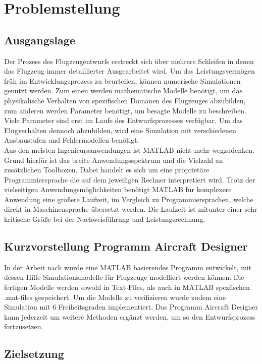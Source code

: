 \chapter{Problemstellung}
\section{Ausgangslage}
Der Prozess des Flugzeugentwurfs erstreckt sich über mehrere Schleifen in denen das Flugzeug immer detaillierter Ausgearbeitet wird. Um das Leistungsvermögen früh im Entwicklungsprozess zu beurteilen, können numerische Simulationen genutzt werden. Zum einen werden mathematische Modelle benötigt, um das physikalische Verhalten von spezifischen Domänen des Flugzeuges abzubilden, zum anderen werden Parameter benötigt, um besagte Modelle zu beschreiben. Viele Parameter sind erst im Laufe des Entwurfsprozesses verfügbar. Um das Flugverhalten dennoch abzubilden, wird eine Simulation mit verschiedenen Ausbaustufen und Fehlermodellen benötigt. \\
Aus den meisten Ingenieursanwendungen ist MATLAB nicht mehr wegzudenken. Grund hierfür ist das breite Anwendungsspektrum und die Vielzahl an zusätzlichen Toolboxen. Dabei handelt es sich um eine proprietäre Programmiersprache die auf dem jeweiligen Rechner interpretiert wird. Trotz der vielseitigen Anwendungsmöglichkeiten benötigt MATLAB für komplexere Anwendung eine größere Laufzeit, im Vergleich zu Programmiersprachen, welche direkt in Maschinensprache übersetzt werden. Die Laufzeit ist mitunter einer sehr kritische Größe bei der Nachweisführung und Leistungsrechnung. 
\section{Kurzvorstellung Programm Aircraft Designer}
In der Arbeit nach  \cite{Olucak.15.02.2017} wurde eine MATLAB basierendes Programm entwickelt, mit dessen Hilfe Simulationsmodelle für Flugzeuge modelliert werden können. Die fertigen Modelle werden sowohl in Text-Files, als auch in MATLAB spezfischen .mat-files gespeichert. Um die Modelle zu verifizieren wurde zudem eine Simulation mit 6 Freiheitsgraden implementiert. Das Programm Aircraft Designer kann jederzeit um weitere Methoden ergänzt werden, um so den Entwurfsprozess fortzusetzen. 
\section{Zielsetzung}
 